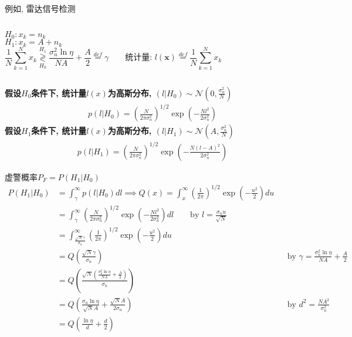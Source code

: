 \begin{frame}[shrink]{例如, 雷达信号检测}
\begin{columns}
$H_0:x_k=n_k$\\
$H_1:x_k=A+n_k$
\[
\frac{1}{N}\sum\limits_{k=1}^{N}x_k\mathop{\gtrless}\limits_{H_0}^{H_1}\frac{\sigma_n^2\ln\eta}{NA}+\frac{A}{2}\mathop{=}\limits^{def}\gamma \qquad \textbf{统计量: }l(\bm{x})\mathop{=}\limits^{def}\frac{1}{N}\sum\limits_{k=1}^{N}x_k
\]
\end{columns}
\textbf{假设$H_0$条件下, 统计量$l(x)$为高斯分布, $(l|H_0)\sim\mathcal{N}(0,\frac{\sigma_n^2}{N})$}
\begin{align*}
p(l|H_0)=\left(\frac{N}{2\pi\sigma_n^2}\right)^{1/2}\exp\left(-\frac{Nl^2}{2\sigma_n^2}\right)
\end{align*}
\textbf{假设$H_1$条件下, 统计量$l(x)$为高斯分布, $(l|H_1)\sim\mathcal{N}(A,\frac{\sigma_n^2}{N})$}
\begin{align*}
p(l|H_1)=\left(\frac{N}{2\pi\sigma_n^2}\right)^{1/2}\exp\left(-\frac{N(l-A)^2}{2\sigma_n^2}\right)
\end{align*}
\end{frame}

\begin{frame}[shrink]{虚警概率$P_F=P(H_1|H_0)$}
\begin{align*}
P(H_1|H_0)&=\int_{\gamma}^{\infty}p(l|H_0)dl\implies Q(x)=\int_{x}^{\infty}\left(\frac{1}{2\pi}\right)^{1/2}\exp\left(-\frac{u^2}{2}\right)du\\
&=\int_{\gamma}^{\infty}\left(\frac{N}{2\pi\sigma_n^2}\right)^{1/2}\exp\left(-\frac{Nl^2}{2\sigma_n^2}\right)dl\qquad \text{by } l=\frac{\sigma_nu}{\sqrt{N}}\\
&=\int_{\frac{\sqrt{N}\gamma}{\sigma_n}}^{\infty}\left(\frac{1}{2\pi}\right)^{1/2}\exp\left(-\frac{u^2}{2}\right)du\\
&=Q\left(\frac{\sqrt{N}\gamma}{\sigma_n}\right) &&\text{by } \gamma=\frac{\sigma_n^2\ln\eta}{NA}+\frac{A}{2}\\
&=Q\left(\frac{\sqrt{N}\left(\frac{\sigma_n^2\ln\eta}{NA}+\frac{A}{2}\right)}{\sigma_n}\right)\\
&=Q\left(\frac{\sigma_n\ln\eta}{\sqrt{N}A}+\frac{\sqrt{N}A}{2\sigma_n}\right) &&\text{by }d^2=\frac{NA^2}{\sigma_n^2}\\
&=Q\left(\frac{\ln\eta}{d}+\frac{d}{2}\right)
\end{align*}
\end{frame}


